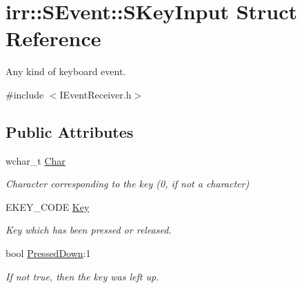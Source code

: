 \hypertarget{structirr_1_1SEvent_1_1SKeyInput}{}\section{irr\+:\+:S\+Event\+:\+:S\+Key\+Input Struct Reference}
\label{structirr_1_1SEvent_1_1SKeyInput}


Any kind of keyboard event.  




{\ttfamily \#include $<$I\+Event\+Receiver.\+h$>$}

\subsection*{Public Attributes}
\begin{DoxyCompactItemize}
\item 
\mbox{\label{structirr_1_1SEvent_1_1SKeyInput_a06ea804f1348b79e0fa175606ab5a479}} 
wchar\+\_\+t \hyperlink{structirr_1_1SEvent_1_1SKeyInput_a06ea804f1348b79e0fa175606ab5a479}{Char}
\begin{DoxyCompactList}\small\item\em Character corresponding to the key (0, if not a character) \end{DoxyCompactList}\item 
\mbox{\label{structirr_1_1SEvent_1_1SKeyInput_a9cb585618a70c835613fec5b5806cb06}} 
E\+K\+E\+Y\+\_\+\+C\+O\+DE \hyperlink{structirr_1_1SEvent_1_1SKeyInput_a9cb585618a70c835613fec5b5806cb06}{Key}
\begin{DoxyCompactList}\small\item\em Key which has been pressed or released. \end{DoxyCompactList}\item 
\mbox{\label{structirr_1_1SEvent_1_1SKeyInput_a9cf0a2a7ba9f2d14de79c420c7ba55d9}} 
bool \hyperlink{structirr_1_1SEvent_1_1SKeyInput_a9cf0a2a7ba9f2d14de79c420c7ba55d9}{Pressed\+Down}\+:1
\begin{DoxyCompactList}\small\item\em If not true, then the key was left up. \end{DoxyCompactList}\item 
\mbox{\label{structirr_1_1SEvent_1_1SKeyInput_a54b1c282890d6f6da7ba2f73d795d45a}} 

\end{DoxyCompactItemize}
